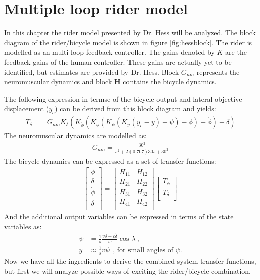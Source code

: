 \section{Multiple loop rider model}
In this chapter the rider model presented by Dr. Hess will be analyzed. The block diagram of the rider/bicycle model is shown in figure \ref{fig:hessblock}. The rider is modelled as an multi loop feedback controller. The gains denoted by $K$ are the feedback gains of the human controller. These gains are actually yet to be identified, but estimates are provided by Dr. Hess. Block $G_{nm}$ represents the neuromuscular dynamics and block $\mathbf{H}$ contains the bicycle dynamics. 

The following expression in termse of the bicycle output and lateral objective displacement ($y_c$) can be derived from this block diagram and yields:
\begin{align}
		T_\delta 	&= G_{nm}K_\delta(K_{\dot{\phi}}(K_\phi(K_\psi(K_y(y_c-y)-\psi)-\phi)-\dot{\phi})-\delta) \nonumber
\end{align}
The neuromuscular dynamics are modelled as:
\begin{align}
		G_{nm} = \frac{30^2}{s^2 +  2(0.707)30s  + 30^2}
\end{align}
The bicycle dynamics can be expressed as a set of transfer functions:
\begin{align}
		\left[\begin{array}{c} \phi \\  \delta \\ \dot{\phi} \\ \dot{\delta} \\ \end{array} \right] = 
				\left[\begin{array}{cc} H_{11}  & H_{12} \\ H_{21}  & H_{22} \\ H_{31}  & H_{32} \\ H_{41}  & H_{42} \\  \end{array}\right]
				\left[\begin{array}{c} T_\phi \\ T_\delta \\ \end{array}\right]
\end{align}
And the additional output variables can be expressed in terms of the state variables as:
\begin{align}
		\psi 	&= \frac{1}{s}\frac{v\delta + c\dot{\delta}}{w}\cos\lambda \  , \\
		y			&\approx \frac{1}{s}v\psi \  \ \textrm{, for small angles of $\psi$.} 
\end{align}
Now we have all the ingredients to derive the combined system transfer functions, but first we will analyze possible ways of exciting the rider/bicycle combination.
